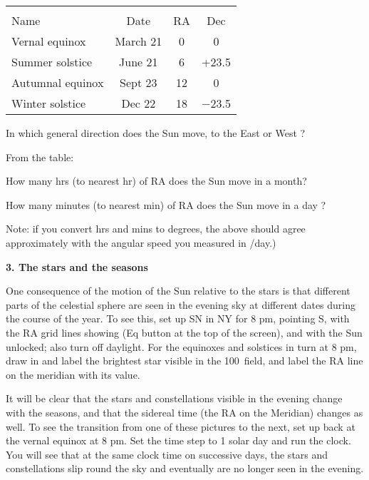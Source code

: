 \documentclass[12pt]{article}
\begin{document}
\begin{center}
\begin{tabular}{lccc} \hline \\ [-6pt]
Name & Date  & \hspace{1cm} RA \hspace{1cm} &Dec \\ [6pt]
\hline
Vernal equinox & March 21  & 0 & 0    \\ \hline
Summer solstice & June 21  & 6 & +23.5 \\ \hline
Autumnal equinox & Sept 23 & 12 &  0     \\ \hline
Winter solstice & Dec 22 & 18  & $-$23.5  \\ \hline
\end{tabular}
\end{center}



\medskip

In which general direction does the Sun move, to the East or West ?  \makebox[2cm]{\hrulefill}

From the table:

How many hrs (to nearest hr) of RA does the Sun move in a month?  \makebox[2cm]{\hrulefill}

How many minutes (to nearest min) of RA does the Sun move in a day ? 
\makebox[2cm]{\hrulefill}

\smallskip
\noindent Note: if you convert hrs and mins to degrees, the above should
agree approximately with the angular speed you measured in \deg/day.)

\bigskip
\noindent
{\bf 3. The stars and the seasons}


\medskip
\noindent
One consequence of the motion of the Sun relative to the stars is that
different parts of the celestial sphere are seen in the evening sky at
different dates during the course of the year. 
To see this, set up SN in NY for 8 pm, pointing S,
with the RA grid lines showing (Eq button at the top of the screen),
and with the Sun unlocked; also turn off daylight.  For the equinoxes
and solstices in turn at 8 pm, draw in and label the brightest star
visible in the 100\deg\ field, and label the RA line on the meridian
with its value.

        \begin{figure*}[h]
        \centerline{}
         \end{figure*}

It will be clear that the stars and constellations visible in the
evening change with the seasons, and that the sidereal time (the RA on
the Meridian) changes as well.
To see the transition from one of these pictures to the next, set up
back at the vernal equinox at 8 pm. Set the time step to 1
solar day and run the clock. You will see that at the same clock time
on successive days, the stars and constellations slip round the sky and
eventually are no longer seen in the evening. 
\end{document}
